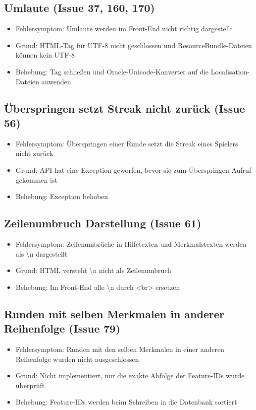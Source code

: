 \documentclass[a4paper]{scrreprt}
\begin{document}
    \subsection{Umlaute (Issue 37, 160, 170)}
    \begin{itemize}
        \item Fehlersymptom: Umlaute werden im Front-End nicht richtig dargestellt
        \item Grund: HTML-Tag für UTF-8 nicht geschlossen und ResourceBundle-Dateien können kein UTF-8
        \item Behebung: Tag schließen und Oracle-Unicode-Konverter auf die Localisation-Dateien anwenden
    \end{itemize}

    \subsection{Überspringen setzt Streak nicht zurück (Issue 56)}
    \begin{itemize}
        \item Fehlersymptom: Überspringen einer Runde setzt die Streak eines Spielers nicht zurück
        \item Grund: API hat eine Exception geworfen, bevor sie zum Überspringen-Aufruf gekommen ist
        \item Behebung: Exception behoben
    \end{itemize}

    \subsection{Zeilenumbruch Darstellung (Issue 61)}
    \begin{itemize}
    \item Fehlersymptom: Zeilenumbrüche in Hilfetexten und Merkmalstexten werden als \textbackslash n dargestellt
    \item Grund: HTML versteht \textbackslash n nicht als Zeilenumbruch
    \item Behebung: Im Front-End alle \textbackslash n durch <br> ersetzen
    \end{itemize}

    \subsection{Runden mit selben Merkmalen in anderer Reihenfolge (Issue 79)}
    \begin{itemize}
    \item Fehlersymptom: Runden mit den selben Merkmalen in einer anderen
     Reihenfolge wurden nicht ausgeschlossen
    \item Grund: Nicht implementiert, nur die exakte Abfolge der Feature-IDs wurde
     überprüft
    \item Behebung: Feature-IDs werden beim Schreiben in die Datenbank sortiert
    \end{itemize}
\end{document}
